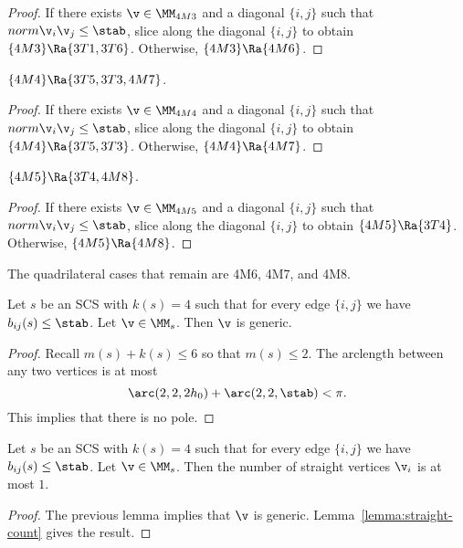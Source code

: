 \begin{proof}
If there exists $\v\in \MM_{4M3}$ and a diagonal $\{i,j\}$ such that $norm{\v_i}{\v_j}\le \stab$,
slice along the diagonal $\{i,j\}$ to obtain 
 $\{4M3\}\Ra \{3T1,3T6\}$.
Otherwise, $\{4M3\}\Ra\{4M6\}$.
\end{proof}

\begin{lemma}[]
$\{4M4\}\Ra\{3T5,3T3,4M7\}$.
\end{lemma}

\begin{proof}
If there exists $\v\in \MM_{4M4}$ and a diagonal $\{i,j\}$ such that $norm{\v_i}{\v_j}\le \stab$,
slice along the diagonal $\{i,j\}$ to obtain 
 $\{4M4\}\Ra \{3T5,3T3\}$.
Otherwise, $\{4M4\}\Ra\{4M7\}$.
\end{proof}

\begin{lemma}[]
$\{4M5\}\Ra\{3T4,4M8\}$.
\end{lemma}

\begin{proof}
If there exists $\v\in \MM_{4M5}$ and a diagonal $\{i,j\}$ such that $norm{\v_i}{\v_j}\le \stab$,
slice along the diagonal $\{i,j\}$ to obtain 
 $\{4M5\}\Ra \{3T4\}$.
Otherwise, $\{4M5\}\Ra\{4M8\}$.
\end{proof}

The quadrilateral cases that remain are 4M6, 4M7, and 4M8.

\begin{lemma}[]
Let $s$ be an SCS with $k(s)=4$ such that for every edge $\{i,j\}$ we have $b_{ij}(s)\le\stab$.
Let $\v\in \MM_s$.  Then $\v$ is generic.
\end{lemma}

\begin{proof}
Recall $m(s) + k(s) \le 6$ so that $m(s)\le 2$.
The arclength between any two vertices is at most
\[
\arc(2,2,2h_0) + \arc(2,2,\stab) < \pi.
\]
This implies that there is no pole.
\end{proof}

\begin{lemma}[]
Let $s$ be an SCS with $k(s)=4$ such that for every edge $\{i,j\}$ we have $b_{ij}(s)\le\stab$.
Let $\v\in \MM_s$.  Then the number of straight vertices $\v_i$ is at most $1$.
\end{lemma}

\begin{proof}
The previous lemma implies that $\v$ is generic. Lemma~\ref{lemma:straight-count} gives the result.
\end{proof}

